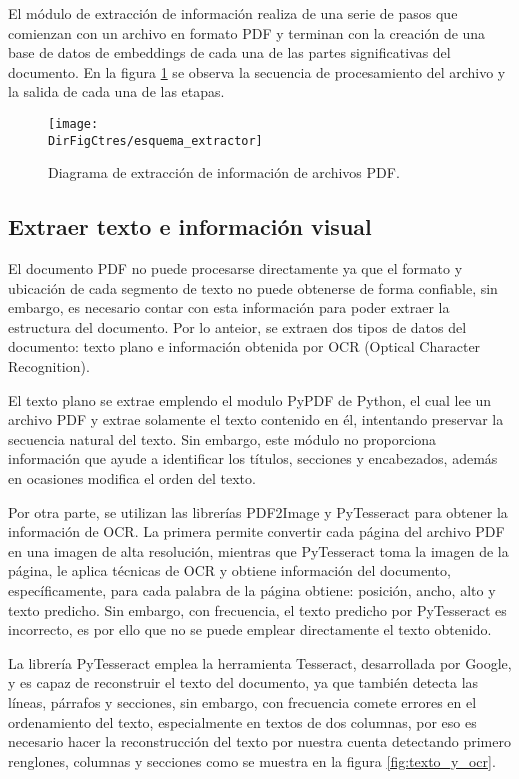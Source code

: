 El módulo de extracción de información realiza de una serie de pasos que comienzan con un
archivo en formato PDF y terminan con la creación de una base de datos de
embeddings de cada una de las partes significativas del documento. En la figura
\ref{fig:esquema_extractor} se observa la secuencia de procesamiento del archivo y la
salida de cada una de las etapas.

\begin{figure}[]
    \centering
    \texttt{[image: \\DirFigCtres/esquema\_extractor]}
    \caption{Diagrama de extracción de información de archivos PDF.}
    \label{fig:esquema_extractor}
\end{figure}

\subsection{Extraer texto e información visual}

El documento PDF no puede procesarse directamente ya que el formato y ubicación
de cada segmento de texto no puede obtenerse de forma confiable,
sin embargo, es necesario contar con esta información para poder extraer la
estructura del documento. Por lo anteior, se extraen dos tipos de datos
del documento: texto plano e información obtenida por OCR (Optical Character
Recognition).

El texto plano se extrae emplendo el modulo PyPDF de Python, el cual lee un archivo
PDF y extrae solamente el texto contenido en él, intentando preservar la secuencia natural
del texto. Sin embargo, este módulo no proporciona información que ayude a
identificar los títulos, secciones y encabezados, además en ocasiones modifica
el orden del texto.

Por otra parte, se utilizan las librerías PDF2Image y PyTesseract para obtener
la información de OCR. La primera permite convertir cada página del archivo PDF
en una imagen de alta resolución, mientras que PyTesseract toma la imagen de la página,
le aplica técnicas de OCR y obtiene información del documento, específicamente,
para cada palabra de la página obtiene: posición, ancho, alto y texto
predicho. Sin embargo, con frecuencia, el texto predicho por PyTesseract es incorrecto,
es por ello que no se puede emplear directamente el texto obtenido.

La librería PyTesseract emplea la herramienta Tesseract, desarrollada por Google,
y es capaz de reconstruir el texto del documento, ya que también detecta las líneas,
párrafos y secciones, sin embargo, con frecuencia comete errores en el ordenamiento
del texto, especialmente en textos de dos columnas, por eso es necesario hacer la
reconstrucción del texto por nuestra cuenta detectando primero renglones,
columnas y secciones como se muestra en la figura \ref{fig:texto_y_ocr}.


